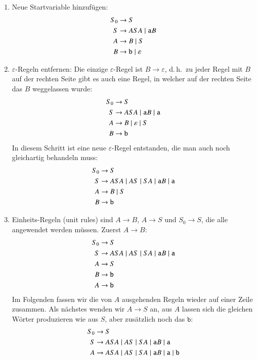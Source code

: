 \begin{enumerate}
\item Neue Startvariable hinzufügen:
\begin{align*}
S_0&\to S\\
S&\to ASA\;|\; {\tt a}B\\
A&\to B\;|\; S\\
B&\to{\tt b}\;|\; \varepsilon
\end{align*}
\item $\varepsilon$-Regeln entfernen: Die einzige $\varepsilon$-Regel
ist $B\to\varepsilon$, d.\,h.~zu jeder Regel mit $B$ auf der rechten
Seite gibt es auch eine Regel, in welcher auf der rechten Seite das $B$
weggelassen wurde:
\begin{align*}
S_0&\to S\\
S&\to ASA\;|\; {\tt a}B\;|\;{\tt a}\\
A&\to B \;|\; \varepsilon \;|\; S\\
B&\to{\tt b}
\end{align*}
In diesem Schritt ist eine neue $\varepsilon$-Regel entstanden, die
man auch noch gleichartig behandeln muss:
\begin{align*}
S_0&\to S\\
S&\to ASA \;|\; AS \;|\; SA \;|\; {\tt a}B\;|\;{\tt a}\\
A&\to B \;|\; S\\
B&\to{\tt b}
\end{align*}
\item Einheits-Regeln (unit rules) sind $A\to B$, $A\to S$ und $S_0\to S$,
die alle angewendet werden müssen.
Zuerst $A\to B$:
\begin{align*}
S_0&\to S\\
S&\to ASA \;|\; AS \;|\; SA \;|\; {\tt a}B\;|\;{\tt a}\\
A&\to S\\
B&\to{\tt b}\\
A&\to{\tt b}
\end{align*}
Im Folgenden fassen wir die von $A$ ausgehenden Regeln wieder auf
einer Zeile zusammen.
Als nächstes wenden wir $A\to S$ an, aus $A$ lassen sich die gleichen
Wörter produzieren wie aus $S$, aber zusätzlich noch das $\texttt{b}$:
\begin{align*}
S_0&\to S\\
S&\to ASA \;|\; AS \;|\; SA \;|\; {\tt a}B\;|\;{\tt a}\\
A&\to ASA \;|\; AS \;|\; SA \;|\; {\tt a}B\;|\;{\tt a}\;|\;{\tt b}\\

\end{align*}
\end{enumerate}
